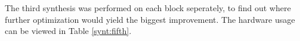 


The third synthesis was performed on each block seperately, to find out 
where further optimization would yield the biggest improvement. The 
hardware usage can be viewed in Table \ref{synt:fifth}.

%
\newcommand{\MyIndent}{\hspace*{0.2cm}}%

